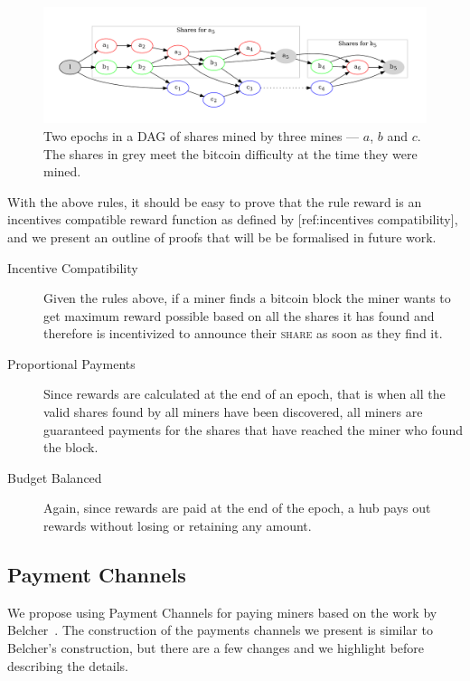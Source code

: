 \documentclass{article}
\begin{document}
\begin{figure}[h]
  \begin{center}
    \includegraphics[width=1.0\textwidth]{shares-dag}
    \caption{Two epochs in a DAG of shares mined by three mines ---
      $a$, $b$ and $c$. The shares in grey meet the bitcoin difficulty
      at the time they were mined.}\label{fig:shares-dag}
  \end{center}
\end{figure}

With the above rules, it should be easy to prove that the rule reward
is an incentives compatible reward function as defined by
[ref:incentives compatibility], and we present an outline of proofs
that will be be formalised in future work.

\begin{description}
  \item [Incentive Compatibility] Given the rules above, if a miner
    finds a bitcoin block the miner wants to get maximum reward
    possible based on all the shares it has found and therefore is
    incentivized to announce their \textsc{share} as soon as they find
    it.
  \item [Proportional Payments] Since rewards are calculated at the
    end of an epoch, that is when all the valid shares found by all
    miners have been discovered, all miners are guaranteed payments
    for the shares that have reached the miner who found the block.
  \item [Budget Balanced] Again, since rewards are paid at the end of
    the epoch, a hub pays out rewards without losing or retaining any
    amount.
\end{description}


\subsection{Payment Channels}

We propose using Payment Channels for paying miners based on the work
by Belcher~\cite{channels-for-rewards}. The construction of the
payments channels we present is similar to Belcher's construction, but
there are a few changes and we highlight before describing the
details.
\end{document}
